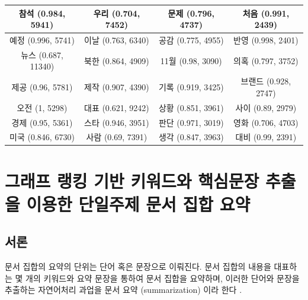 \documentclass[11pt]{article}
\begin{document}
\begin{table}[H]
\begin{tabular}{|c|c|c|c|}
참석 (0.984, 5941) & 우리 (0.704, 7452) & 문제 (0.796, 4737) & 처음 (0.991, 2439) \\ \hline
예정 (0.996, 5741) & 이날 (0.763, 6340) & 공감 (0.775, 4955) & 반영 (0.998, 2401) \\ \hline
뉴스 (0.687, 11340) & 북한 (0.864, 4909) & 11월 (0.98, 3090) & 의혹 (0.797, 3752) \\ \hline
제공 (0.96, 5781) & 제작 (0.907, 4390) & 기록 (0.919, 3425) & 브랜드 (0.928, 2747) \\ \hline
오전 (1, 5298) & 대표 (0.621, 9242) & 상황 (0.851, 3961) & 사이 (0.89, 2979) \\ \hline
경제 (0.95, 5361) & 스타 (0.946, 3951) & 판단 (0.971, 3019) & 영화 (0.706, 4703) \\ \hline
미국 (0.846, 6730) & 사람 (0.69, 7391) & 생각 (0.847, 3963) & 대비 (0.99, 2391) \\ \hline
\end{tabular}%
\end{table}


\newpage
\section{그래프 랭킹 기반 키워드와 핵심문장 추출을 이용한 단일주제 문서 집합 요약} \label{summarize_single_topic}

\subsection{서론}

문서 집합의 요약의 단위는 단어 혹은 문장으로 이뤄진다.
문서 집합의 내용을 대표하는 몇 개의 키워드와 요약 문장을 통하여 문서 집합을 요약하며, 이러한 단어와 문장을 추출하는 자연어처리 과업을 문서 요약 (summarization) 이라 한다 \citep{yao2017recent}.
\end{document}
